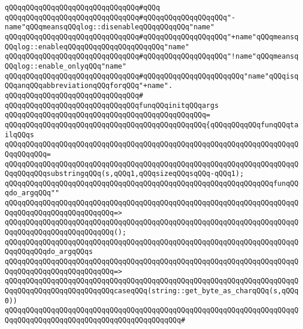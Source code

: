 \verb|qQQqqQQqqQQqqQQqqQQqqQQqqQQqqQQq#qQQq|\newline
\verb|qQQqqQQqqQQqqQQqqQQqqQQqqQQqqQQq#qQQqqQQqqQQqqQQqqQQq"-name"qQQqmeansqQQqlog::disenableqQQqqQQqqQQq"name"|\newline
\verb|qQQqqQQqqQQqqQQqqQQqqQQqqQQqqQQq#qQQqqQQqqQQqqQQqqQQq"+name"qQQqmeansqQQqlog::enableqQQqqQQqqQQqqQQqqQQqqQQq"name"|\newline
\verb|qQQqqQQqqQQqqQQqqQQqqQQqqQQqqQQq#qQQqqQQqqQQqqQQqqQQq"!name"qQQqmeansqQQqlog::enable_onlyqQQq"name"|\newline
\verb|qQQqqQQqqQQqqQQqqQQqqQQqqQQqqQQq#qQQqqQQqqQQqqQQqqQQqqQQq"name"qQQqisqQQqanqQQqabbreviationqQQqforqQQq"+name".|\newline
\verb|qQQqqQQqqQQqqQQqqQQqqQQqqQQqqQQq#|\newline
\verb|qQQqqQQqqQQqqQQqqQQqqQQqqQQqqQQqfunqQQqinitqQQqargs|\newline
\verb|qQQqqQQqqQQqqQQqqQQqqQQqqQQqqQQqqQQqqQQqqQQqqQQq=|\newline
\verb|qQQqqQQqqQQqqQQqqQQqqQQqqQQqqQQqqQQqqQQqqQQqqQQq{qQQqqQQqqQQqfunqQQqtailqQQqs|\newline
\verb|qQQqqQQqqQQqqQQqqQQqqQQqqQQqqQQqqQQqqQQqqQQqqQQqqQQqqQQqqQQqqQQqqQQqqQQqqQQqqQQq=|\newline
\verb|qQQqqQQqqQQqqQQqqQQqqQQqqQQqqQQqqQQqqQQqqQQqqQQqqQQqqQQqqQQqqQQqqQQqqQQqqQQqqQQqsubstringqQQq(s,qQQq1,qQQqsizeqQQqsqQQq-qQQq1);|\newline
\newline
\newline
\verb|qQQqqQQqqQQqqQQqqQQqqQQqqQQqqQQqqQQqqQQqqQQqqQQqqQQqqQQqqQQqqQQqfunqQQqdo_argqQQq""|\newline
\verb|qQQqqQQqqQQqqQQqqQQqqQQqqQQqqQQqqQQqqQQqqQQqqQQqqQQqqQQqqQQqqQQqqQQqqQQqqQQqqQQqqQQqqQQqqQQqqQQq=>|\newline
\verb|qQQqqQQqqQQqqQQqqQQqqQQqqQQqqQQqqQQqqQQqqQQqqQQqqQQqqQQqqQQqqQQqqQQqqQQqqQQqqQQqqQQqqQQqqQQqqQQq();|\newline
\newline
\verb|qQQqqQQqqQQqqQQqqQQqqQQqqQQqqQQqqQQqqQQqqQQqqQQqqQQqqQQqqQQqqQQqqQQqqQQqqQQqqQQqdo_argqQQqs|\newline
\verb|qQQqqQQqqQQqqQQqqQQqqQQqqQQqqQQqqQQqqQQqqQQqqQQqqQQqqQQqqQQqqQQqqQQqqQQqqQQqqQQqqQQqqQQqqQQqqQQq=>|\newline
\verb|qQQqqQQqqQQqqQQqqQQqqQQqqQQqqQQqqQQqqQQqqQQqqQQqqQQqqQQqqQQqqQQqqQQqqQQqqQQqqQQqqQQqqQQqqQQqqQQqcaseqQQq(string::get_byte_as_charqQQq(s,qQQq0))|\newline
\verb|qQQqqQQqqQQqqQQqqQQqqQQqqQQqqQQqqQQqqQQqqQQqqQQqqQQqqQQqqQQqqQQqqQQqqQQqqQQqqQQqqQQqqQQqqQQqqQQqqQQqqQQqqQQqqQQq#|\newline
